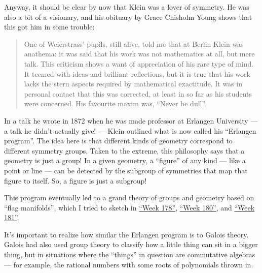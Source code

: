 \documentclass{article}
\renewcommand{\texttt}[1]{%
  \begingroup
  \ttfamily
  \begingroup\lccode`~=`/\lowercase{\endgroup\def~}{/\discretionary{}{}{}}%
  \begingroup\lccode`~=`[\lowercase{\endgroup\def~}{[\discretionary{}{}{}}%
  \begingroup\lccode`~=`.\lowercase{\endgroup\def~}{.\discretionary{}{}{}}%
  \catcode`/=\active\catcode`[=\active\catcode`.=\active
  \scantokens{#1\noexpand}%
  \endgroup
}
\begin{document}

Anyway, it should be clear by now that Klein was a lover of symmetry. He
was also a bit of a visionary, and his obituary by Grace Chisholm Young
shows that this got him in some trouble:

\begin{quote}
One of Weierstrass' pupils, still alive, told me that at Berlin Klein
was anathema: it was said that his work was not mathematics at all, but
mere talk. This criticism shows a want of appreciation of his rare type
of mind. It teemed with ideas and brilliant reflections, but it is true
that his work lacks the stern aspects required by mathematical
exactitude. It was in personal contact that this was corrected, at least
in so far as his students were concerned. His favourite maxim was,
``Never be dull''.
\end{quote}

In a talk he wrote in 1872 when he was made professor at Erlangen
University --- a talk he didn't actually give! --- Klein outlined what
is now called his ``Erlangen program''. The idea here is that different
kinds of geometry correspond to different symmetry groups. Taken to the
extreme, this philosophy says that a geometry is just a group! In a
given geometry, a ``figure'' of any kind --- like a point or line ---
can be detected by the subgroup of symmetries that map that figure to
itself. So, a figure is just a subgroup!

This program eventually led to a grand theory of groups and geometry
based on ``flag manifolds'', which I tried to sketch in
\protect\hyperlink{week178}{``Week 178''},
\protect\hyperlink{week180}{``Week 180''}, and
\protect\hyperlink{week181}{``Week 181''}.

It's important to realize how similar the Erlangen program is to Galois
theory. Galois had also used group theory to classify how a little thing
can sit in a bigger thing, but in situations where the ``things'' in
question are commutative algebras --- for example, the rational numbers
with some roots of polynomials thrown in.
\end{document}
